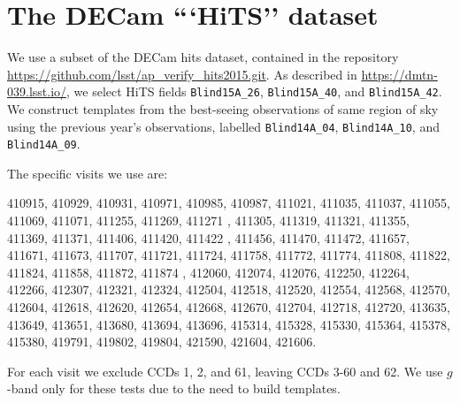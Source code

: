 \documentclass[DM,STS,toc]{lsstdoc}
\begin{document}



\appendix

\section{The DECam ```HiTS'' dataset}

We use a subset of the DECam hits dataset, contained in the repository
\url{https://github.com/lsst/ap\_verify\_hits2015.git}.  As described in
\url{https://dmtn-039.lsst.io/}, we select HiTS fields \texttt{Blind15A\_26},
\texttt{Blind15A\_40}, and \texttt{Blind15A\_42}. We construct templates from the best-seeing observations of
same region of sky using the previous year's observations, labelled
\texttt{Blind14A\_04}, \texttt{Blind14A\_10}, and \texttt{Blind14A\_09}.

The specific visits we use are:

410915, 410929, 410931, 410971, 410985, 410987, 411021, 411035,
        411037, 411055, 411069, 411071, 411255, 411269, 411271 , 411305,
        411319, 411321, 411355, 411369, 411371, 411406, 411420, 411422 ,
        411456, 411470, 411472, 411657, 411671, 411673, 411707, 411721, 411724,
        411758, 411772, 411774, 411808, 411822, 411824, 411858, 411872,
        411874 , 412060, 412074, 412076, 412250, 412264, 412266, 412307,
        412321, 412324, 412504, 412518, 412520, 412554, 412568, 412570, 412604,
        412618, 412620, 412654, 412668, 412670, 412704, 412718, 412720, 413635,
        413649, 413651, 413680, 413694, 413696, 415314, 415328, 415330, 415364,
        415378, 415380, 419791, 419802, 419804, 421590, 421604, 421606.

For each visit we exclude CCDs 1, 2, and 61, leaving CCDs 3-60 and 62.  We use $g$-band only for these tests due to the need to build templates.
\end{document}
